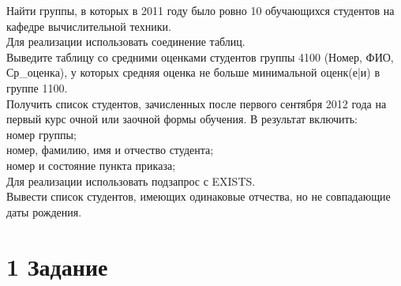 \documentclass[14pt]{extreport}
\begin{document}
            Найти группы, в которых в 2011 году было ровно 10 обучающихся студентов на кафедре вычислительной техники.\\
            Для реализации использовать соединение таблиц.\\
            Выведите таблицу со средними оценками студентов группы 4100 (Номер, ФИО, Ср\_оценка), у которых средняя оценка не больше минимальной оценк(е|и) в группе 1100.\\
            Получить список студентов, зачисленных после первого сентября 2012 года на первый курс очной или заочной формы обучения. В результат включить: \\
            номер группы;\\
            номер, фамилию, имя и отчество студента;\\
            номер и состояние пункта приказа;\\
            Для реализации использовать подзапрос с EXISTS. \\
            Вывести список студентов, имеющих одинаковые отчества, но не совпадающие даты рождения. \\

\section{1 Задание}
\end{document}
